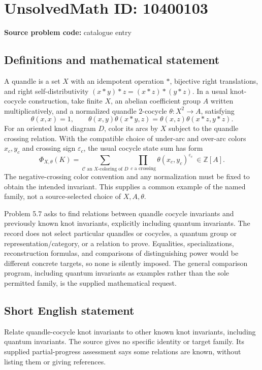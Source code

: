 \documentclass[11pt]{article}
\newcommand{\Z}{\mathbb{Z}}
\newcommand{\eps}{\varepsilon}
\begin{document}
\section*{UnsolvedMath ID: 10400103}
\textbf{Source problem code:} catalogue entry
\subsection{Definitions and mathematical statement}
A quandle is a set \(X\) with an idempotent operation \(*\), bijective right translations, and right self-distributivity \((x*y)*z=(x*z)*(y*z)\). In a usual knot-cocycle construction, take finite \(X\), an abelian coefficient group \(A\) written multiplicatively, and a normalized quandle \(2\)-cocycle \(\theta:X^2\to A\), satisfying
\[
 \theta(x,x)=1,\qquad
 \theta(x,y)\theta(x*y,z)=\theta(x,z)\theta(x*z,y*z).
\]
For an oriented knot diagram \(D\), color its arcs by \(X\) subject to the quandle crossing relation. With the compatible choice of under-arc and over-arc colors \(x_c,y_c\) and crossing sign \(\eps_c\), the usual cocycle state sum has form
\[
 \Phi_{X,\theta}(K)=
 \sum_{\mathcal C\text{ an }X\text{-coloring of }D}
      \prod_{c\text{ a crossing}}\theta(x_c,y_c)^{\eps_c}
       \ \in\Z[A].
\]
The negative-crossing color convention and any normalization must be fixed to obtain the intended invariant. This supplies a common example of the named family, not a source-selected choice of \(X,A,\theta\).

Problem 5.7 asks to find relations between quandle cocycle invariants and previously known knot invariants, explicitly including quantum invariants. The record does not select particular quandles or cocycles, a quantum group or representation/category, or a relation to prove. Equalities, specializations, reconstruction formulas, and comparisons of distinguishing power would be different concrete targets, so none is silently imposed. The general comparison program, including quantum invariants as examples rather than the sole permitted family, is the supplied mathematical request.
\subsection{Short English statement}
Relate quandle-cocycle knot invariants to other known knot invariants, including quantum invariants. The source gives no specific identity or target family. Its supplied partial-progress assessment says some relations are known, without listing them or giving references.
\end{document}

